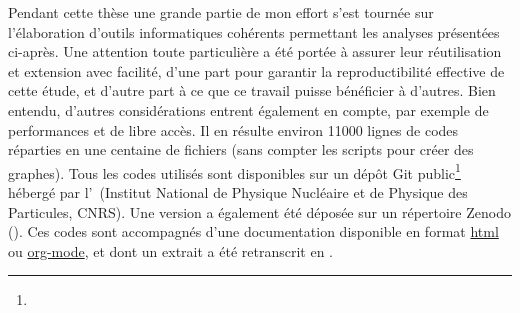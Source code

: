 \bigskip

Pendant cette thèse une grande partie de mon effort s'est tournée sur l'élaboration d'outils informatiques cohérents  permettant les analyses présentées ci-après.
Une attention toute particulière a été portée à assurer leur réutilisation et extension avec facilité, d'une part pour garantir la reproductibilité effective de cette étude, et d'autre part à ce que ce travail puisse bénéficier à d'autres.
Bien entendu, d'autres considérations entrent également en compte, par exemple de performances et de libre accès.
Il en résulte environ \num{11000} lignes de codes réparties en une centaine de fichiers (sans compter les scripts pour créer des graphes).
Tous les codes utilisés sont disponibles sur un dépôt Git public\footnote{} hébergé par l'~(Institut National de Physique Nucléaire et de Physique des Particules, CNRS).
Une version a également été déposée sur un répertoire Zenodo (\hbox{}).
Ces codes sont accompagnés d'une documentation disponible en format \href{https://clementhaeck.pages.in2p3.fr/submeso-color/}{\textsf{html}} ou \href{https://gitlab.in2p3.fr/clementhaeck/submeso-color/-/blob/develop/docs/index.org}{\textsf{org-mode}}, et dont un extrait a été retranscrit en .

